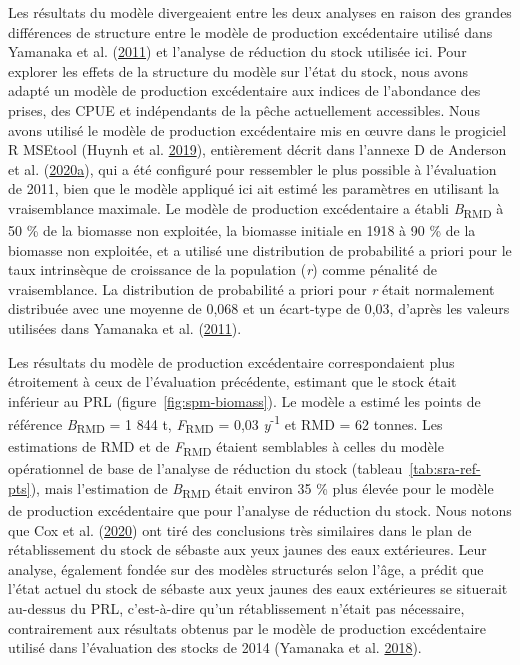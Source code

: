 \documentclass[11pt]{book}
\begin{document}
Les résultats du modèle divergeaient entre les deux analyses en raison des grandes différences de structure entre le modèle de production excédentaire utilisé dans Yamanaka et al. (\protect\hyperlink{ref-yamanaka2011}{2011}) et l'analyse de réduction du stock utilisée ici. Pour explorer les effets de la structure du modèle sur l'état du stock, nous avons adapté un modèle de production excédentaire aux indices de l'abondance des prises, des CPUE et indépendants de la pêche actuellement accessibles. Nous avons utilisé le modèle de production excédentaire mis en œuvre dans le progiciel R MSEtool (Huynh et al. \protect\hyperlink{ref-huynh_msetool_2019}{2019}), entièrement décrit dans l'annexe D de Anderson et al. (\protect\hyperlink{ref-anderson2020gfmp}{2020}\protect\hyperlink{ref-anderson2020gfmp}{a}), qui a été configuré pour ressembler le plus possible à l'évaluation de 2011, bien que le modèle appliqué ici ait estimé les paramètres en utilisant la vraisemblance maximale. Le modèle de production excédentaire a établi \emph{B}\textsubscript{RMD} à 50 \% de la biomasse non exploitée, la biomasse initiale en 1918 à 90 \% de la biomasse non exploitée, et a utilisé une distribution de probabilité a priori pour le taux intrinsèque de croissance de la population (\emph{r}) comme pénalité de vraisemblance. La distribution de probabilité a priori pour \emph{r} était normalement distribuée avec une moyenne de 0,068 et un écart-type de 0,03, d'après les valeurs utilisées dans Yamanaka et al. (\protect\hyperlink{ref-yamanaka2011}{2011}).

Les résultats du modèle de production excédentaire correspondaient plus étroitement à ceux de l'évaluation précédente, estimant que le stock était inférieur au PRL (figure~\ref{fig:spm-biomass}). Le modèle a estimé les points de référence \emph{B}\textsubscript{RMD} = 1 844 t, \emph{F}\textsubscript{RMD} = 0,03 \emph{y}\textsuperscript{-1} et RMD = 62 tonnes. Les estimations de RMD et de \emph{F}\textsubscript{RMD} étaient semblables à celles du modèle opérationnel de base de l'analyse de réduction du stock (tableau~\ref{tab:sra-ref-pts}), mais l'estimation de \emph{B}\textsubscript{RMD} était environ 35 \% plus élevée pour le modèle de production excédentaire que pour l'analyse de réduction du stock. Nous notons que Cox et al. (\protect\hyperlink{ref-cox2020}{2020}) ont tiré des conclusions très similaires dans le plan de rétablissement du stock de sébaste aux yeux jaunes des eaux extérieures. Leur analyse, également fondée sur des modèles structurés selon l'âge, a prédit que l'état actuel du stock de sébaste aux yeux jaunes des eaux extérieures se situerait au-dessus du PRL, c'est-à-dire qu'un rétablissement n'était pas nécessaire, contrairement aux résultats obtenus par le modèle de production excédentaire utilisé dans l'évaluation des stocks de 2014 (Yamanaka et al. \protect\hyperlink{ref-yamanaka2018yelloweyeoutside}{2018}).
\end{document}
